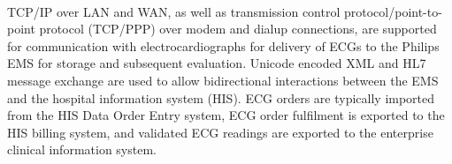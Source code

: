 \documentclass[12pt]{article}
\begin{document}
\paragraph{}TCP/IP over LAN and WAN, as well as transmission control protocol/point-to-point protocol (TCP/PPP) over modem and dialup connections, are supported for communication with electrocardiographs for delivery of ECGs to the Philips EMS for storage and subsequent evaluation.
Unicode encoded XML and HL7 message exchange are used to allow bidirectional interactions between the EMS and the hospital information system (HIS).
ECG orders are typically imported from the HIS Data Order Entry system, ECG order fulfilment is exported to the HIS billing system, and validated ECG readings are exported to the enterprise clinical information system.
\end{document}
